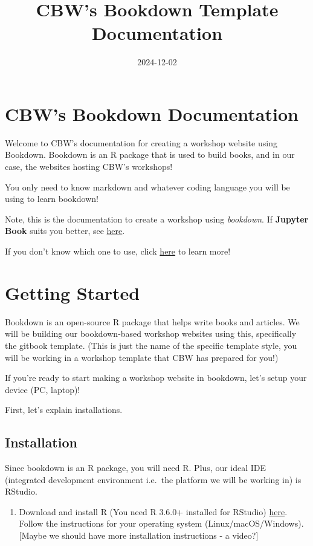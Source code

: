 \documentclass[
]{book}
\title{CBW's Bookdown Template Documentation}
\author{}
\date{\vspace{-2.5em}2024-12-02}
\providecommand{\tightlist}{%
  \setlength{\itemsep}{0pt}\setlength{\parskip}{0pt}}
\theoremstyle{definition}
\theoremstyle{definition}
\theoremstyle{definition}
\theoremstyle{definition}
\theoremstyle{remark}
\begin{document}
\maketitle

{
\setcounter{tocdepth}{1}
\tableofcontents
}
\chapter{CBW's Bookdown Documentation}\label{cbws-bookdown-documentation}

Welcome to CBW's documentation for creating a workshop website using Bookdown. Bookdown is an R package that is used to build books, and in our case, the websites hosting CBW's workshops!

You only need to know markdown and whatever coding language you will be using to learn bookdown!

Note, this is the documentation to create a workshop using \emph{bookdown}. If \textbf{Jupyter Book} suits you better, see \href{https://cbw-dev.github.io/jupyterbook-docs/}{here}.

If you don't know which one to use, click \href{}{here} to learn more!

\chapter{Getting Started}\label{getting-started}

Bookdown is an open-source R package that helps write books and articles. We will be building our bookdown-based workshop websites using this, specifically the gitbook template. (This is just the name of the specific template style, you will be working in a workshop template that CBW has prepared for you!)

If you're ready to start making a workshop website in bookdown, let's setup your device (PC, laptop)!

First, let's explain installations.

\section{Installation}\label{installation}

Since bookdown is an R package, you will need R. Plus, our ideal IDE (integrated development environment i.e.~the platform we will be working in) is RStudio.

\begin{enumerate}
\def\labelenumi{\arabic{enumi}.}
\tightlist
\item
  Download and install R (You need R 3.6.0+ installed for RStudio) \href{https://cran.rstudio.com/}{here}. Follow the instructions for your operating system (Linux/macOS/Windows).
  {[}Maybe we should have more installation instructions - a video?{]}
\end{enumerate}
\end{document}
